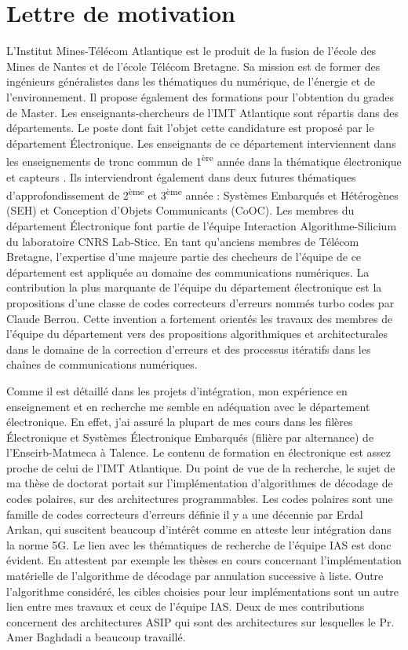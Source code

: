 \section{Lettre de motivation}

L'Institut Mines-Télécom Atlantique est le produit de la fusion de l'école des Mines de Nantes et de l'école Télécom Bretagne. 
Sa mission est de former des ingénieurs généralistes dans les thématiques du numérique, de l'énergie et de l'environnement.
Il propose également des formations pour l'obtention du grades de Master.
Les enseignants-chercheurs de l'IMT Atlantique sont répartis dans des départements.
Le poste dont fait l'objet cette candidature est proposé par le département \'Electronique.
Les enseignants de ce département interviennent dans les enseignements de tronc commun de 1\textsuperscript{ère} année dans la thématique \og électronique et capteurs \fg{}.
Ils interviendront également dans deux futures thématiques d'approfondissement de 2\textsuperscript{ème} et 3\textsuperscript{ème} année : Systèmes Embarqués et Hétérogènes (SEH) et Conception d'Objets Communicants (CoOC).
Les membres du département \'Electronique font partie de l'équipe \og Interaction Algorithme-Silicium \fg du laboratoire CNRS Lab-Sticc.
En tant qu'anciens membres de Télécom Bretagne, l'expertise d'une majeure partie des checheurs de l'équipe de ce département est appliquée au domaine des communications numériques. 
La contribution la plus marquante de l'équipe du département électronique est la propositions d'une classe de codes correcteurs d'erreurs nommés turbo codes par Claude Berrou. 
Cette invention a fortement orientés les travaux des membres de l'équipe du département vers des propositions algorithmiques et architecturales dans le domaine de la correction d'erreurs et des processus itératifs dans les chaînes de communications numériques.

Comme il est détaillé dans les projets d'intégration, mon expérience en enseignement et en recherche me semble en adéquation avec le département électronique.
En effet, j'ai assuré la plupart de mes cours dans les filères \'Electronique et Systèmes \'Electronique Embarqués (filière par alternance) de l'Enseirb-Matmeca à Talence. Le contenu de formation en électronique est assez proche de celui de l'IMT Atlantique.
Du point de vue de la recherche, le sujet de ma thèse de doctorat portait sur l'implémentation d'algorithmes de décodage de codes polaires, sur des architectures programmables. Les codes polaires sont une famille de codes correcteurs d'erreurs définie il y a une décennie par Erdal Ar\i{}kan, qui suscitent beaucoup d'intérêt comme en atteste leur intégration dans la norme 5G. Le lien avec les thématiques de recherche de l'équipe IAS est donc évident. En attestent par exemple les thèses en cours concernant l'implémentation matérielle de l'algorithme de décodage par annulation successive à liste. Outre l'algorithme considéré, les cibles choisies pour leur implémentations sont un autre lien entre mes travaux et ceux de l'équipe IAS. Deux de mes contributions concernent des architectures ASIP qui sont des architectures sur lesquelles le Pr. Amer Baghdadi a beaucoup travaillé.

